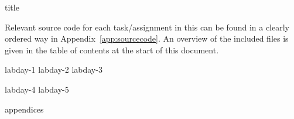 \documentclass[11pt,titlepage]{report}
\begin{document}
{title}

\clearpage
\tableofcontents

\clearpage
{}
Relevant source code for each task/assignment in this can be found in a clearly ordered way in Appendix~\ref{app:sourcecode}. An overview of the included files is given in the table of contents at the start of this document.

{labday-1}
{labday-2}
{labday-3}

{labday-4}
{labday-5}

\clearpage
{}
\printbibliography[heading=bibintoc]

\clearpage
{}
{appendices}
\end{document}
